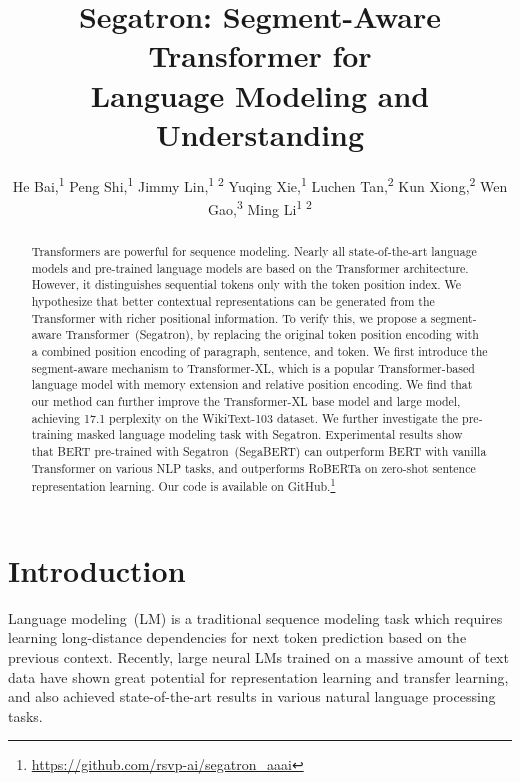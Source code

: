 \documentclass[letterpaper]{article}
\title{Segatron: Segment-Aware Transformer for \\Language Modeling and Understanding}
\author{
He Bai,\textsuperscript{\rm 1}
Peng Shi,\textsuperscript{\rm 1}
Jimmy Lin,\textsuperscript{\rm 1 \rm 2}
Yuqing Xie,\textsuperscript{\rm 1}
Luchen Tan,\textsuperscript{\rm 2}
Kun Xiong,\textsuperscript{\rm 2}
Wen Gao,\textsuperscript{\rm 3}
Ming Li\textsuperscript{\rm 1 \rm 2} \\ }
\begin{document}
\maketitle

\begin{abstract}
Transformers are powerful for sequence modeling. 
Nearly all state-of-the-art language models and pre-trained language models are based on the Transformer architecture. 
However, it distinguishes sequential tokens only with the token position index.
We hypothesize that better contextual representations can be generated from the Transformer with richer positional information.
To verify this, we propose a segment-aware Transformer~(Segatron), by replacing the original token position encoding with a combined position encoding of paragraph, sentence, and token. 
We first introduce the segment-aware mechanism to Transformer-XL, which is a popular Transformer-based language model with memory extension and relative position encoding. 
We find that our method can further improve the Transformer-XL base model and large model, achieving 17.1 perplexity on the WikiText-103 dataset.
We further investigate the pre-training masked language modeling task with Segatron. 
Experimental results show that BERT pre-trained with Segatron~(SegaBERT) can outperform BERT with vanilla Transformer on various NLP tasks, and outperforms RoBERTa on zero-shot sentence representation learning. Our code is available on GitHub.\footnote{\url{https://github.com/rsvp-ai/segatron_aaai}} \end{abstract}

\section{Introduction}

Language modeling~(LM) is a traditional sequence modeling task which requires learning long-distance dependencies for next token prediction based on the previous context.
Recently, large neural LMs trained on a massive amount of text data have shown great potential for representation learning and transfer learning, and also achieved state-of-the-art results in various natural language processing tasks. 
\end{document}
